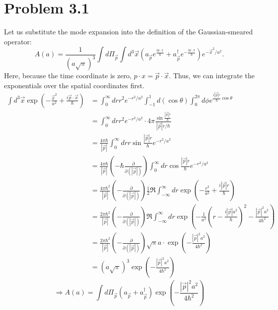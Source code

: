 \documentclass[11pt]{article}
\begin{document}
\section*{Problem 3.1}
Let us substitute the mode expansion into the definition of the Gaussian-smeared operator:
\[
    A(a)
    = \frac{1}{(a\sqrt{\pi})^3} \int d\Pi_{\vec{p}} \int d^3\vec{x} \left(
        a_{\vec{p}} e^{\frac{ip\cdot x}{\hbar}} + a_{\vec{p}}^\dagger e^{-\frac{ip\cdot x}{\hbar}}
    \right) e^{-\vec{x}^2/a^2}.
\]
Here, because the time coordinate is zero, $p\cdot x = \vec{p}\cdot\vec{x}$.
Thus, we can integrate the exponentials over the spatial coordinates first.
\begin{align*}
    \int d^3\vec{x} \exp\left(-\frac{\vec{x}^2}{a^2} + \frac{i\vec{p}\cdot\vec{x}}{\hbar}\right)
    &= \int_0^\infty dr r^2 e^{-r^2/a^2} \int_{-1}^1 d(\cos\theta) \int_0^{2\pi} d\phi
        e^{\frac{i|\vec{p}|r}{\hbar}\cos\theta} \\
    &= \int_0^\infty dr r^2 e^{-r^2/a^2} \cdot 4\pi
        \frac{\sin\frac{|\vec{p}|r}{\hbar}}{|\vec{p}|r/\hbar} \\
    &= \frac{4\pi\hbar}{|\vec{p}|} \int_0^\infty dr r\sin\frac{|\vec{p}|r}{\hbar} e^{-r^2/a^2} \\
    &= \frac{4\pi\hbar}{|\vec{p}|}
        \left(-\hbar\frac{\partial}{\partial(|\vec{p}|)}\right)
        \int_0^\infty dr \cos\frac{|\vec{p}|r}{\hbar} e^{-r^2/a^2} \\
    &= \frac{4\pi\hbar^2}{|\vec{p}|}
        \left(-\frac{\partial}{\partial(|\vec{p}|)}\right)
        \frac{1}{2} \Re \int_{-\infty}^\infty dr \exp\left(
            -\frac{r^2}{a^2} + \frac{i|\vec{p}|r}{\hbar}
        \right) \\
    &= \frac{2\pi\hbar^2}{|\vec{p}|}
        \left(-\frac{\partial}{\partial(|\vec{p}|)}\right)
        \Re \int_{-\infty}^\infty dr \exp\left(
            -\frac{1}{a^2}\left(r - \frac{i|\vec{p}|a^2}{\hbar}\right)^2
            -\frac{|\vec{p}|^2a^2}{4\hbar^2}
        \right) \\
    &= \frac{2\pi\hbar^2}{|\vec{p}|}
        \left(-\frac{\partial}{\partial(|\vec{p}|)}\right)
        \sqrt{\pi}a \cdot \exp\left(-\frac{|\vec{p}|^2 a^2}{4\hbar^2}\right) \\
    &= (a\sqrt{\pi})^3 \exp\left(-\frac{|\vec{p}|^2 a^2}{4\hbar^2}\right)
\end{align*}
\[
    \Rightarrow A(a)
    = \int d\Pi_{\vec{p}} \left( a_{\vec{p}} + a_{\vec{p}}^\dagger \right)
        \exp\left(-\frac{|\vec{p}|^2 a^2}{4\hbar^2}\right)
\]
\end{document}

